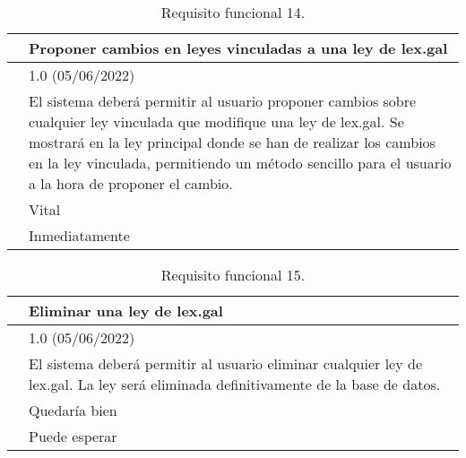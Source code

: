 \begin{table}[H]
\begin{center}
\begin{tabular}{|p{3cm}|p{10cm}|} \hline
\centering {\bf FRQ-14} & Proponer cambios en leyes vinculadas a una ley de lex.gal  \\ \hline\hline
\centering {\bf Versión} & 1.0 (05/06/2022) \\ \hline
\centering {\bf Descripción} & El sistema deberá permitir al usuario proponer cambios sobre cualquier ley vinculada que modifique una ley de lex.gal. Se mostrará en la ley principal donde se han de realizar los cambios en la ley vinculada, permitiendo un método sencillo para el usuario a la hora de proponer el cambio.  \\ \hline
\centering {\bf Importancia} & Vital \\ \hline
\centering {\bf Urgencia} & Inmediatamente \\ \hline
\end{tabular}
\caption{Requisito funcional 14.}
\label{enlaceFRQ14}
\end{center}
\end{table}

\begin{table}[H]
\begin{center}
\begin{tabular}{|p{3cm}|p{10cm}|} \hline
\centering {\bf FRQ-15} & Eliminar una ley de lex.gal  \\ \hline\hline
\centering {\bf Versión} & 1.0 (05/06/2022) \\ \hline
\centering {\bf Descripción} & El sistema deberá permitir al usuario eliminar cualquier ley de lex.gal. La ley será eliminada definitivamente de la base de datos. \\ \hline
\centering {\bf Importancia} & Quedaría bien \\ \hline
\centering {\bf Urgencia} & Puede esperar \\ \hline
\end{tabular}
\caption{Requisito funcional 15.}
\label{enlaceFRQ15}
\end{center}
\end{table}